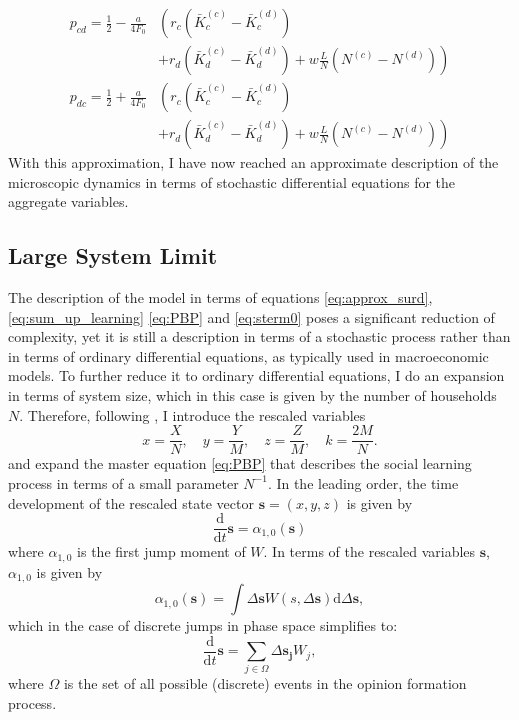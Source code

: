 \begin{align}
	p_{cd} = \frac{1}{2} - \frac{a}{4 F_0} &\left(r_c\left( \bar{K}_c^{(c)} - \bar{K}_c^{(d)} \right) \right. \nonumber \\ 
	& \left. + r_d\left( \bar{K}_d^{(c)} - \bar{K}_d^{(d)} \right) + w\frac{L}{N}\left( N^{(c)} - N^{(d)} \right) \right) \label{eq:approx_p_cd_final}\\
	p_{dc} = \frac{1}{2} + \frac{a}{4 F_0} &\left(r_c\left( \bar{K}_c^{(c)} - \bar{K}_c^{(d)} \right) \right. \nonumber \\ 
	& \left. + r_d\left( \bar{K}_d^{(c)} - \bar{K}_d^{(d)} \right) + w\frac{L}{N}\left( N^{(c)} - N^{(d)} \right) \right)  \label{eq:approx_p_dc_final}
\end{align}
With this approximation, I have now reached an approximate description of the microscopic dynamics in terms of stochastic differential equations for the aggregate variables.
\subsection{Large System Limit}
\label{sec:large_system_limit}
The description of the model in terms of equations \eqref{eq:approx_surd}, \eqref{eq:sum_up_learning} \eqref{eq:PBP} and \eqref{eq:sterm0} poses a significant reduction of complexity, yet it is still a description in terms of a stochastic process rather than in terms of ordinary differential equations, as typically used in macroeconomic models. To further reduce it to ordinary differential equations, I do an expansion in terms of system size, which in this case is given by the number of households $N$.
Therefore, following \citet[p. 244]{VanKampen1992}, I introduce the rescaled variables
\begin{equation}
	x = \frac{X}{N}, \quad y = \frac{Y}{M}, \quad z = \frac{Z}{M}, \quad k = \frac{2M}{N}.
	\label{eq:rescalled_pbp_variables}
\end{equation}
and expand the master equation \eqref{eq:PBP} that describes the social learning process in terms of a small parameter $N^{-1}$. In the leading order, the time development of the rescaled state vector $\mathbf{s} = (x, y, z)$ is given by 
\begin{equation}
	\frac{\mathrm{d}}{\mathrm{d}t}\mathbf{s} = \alpha_{1,0}(\mathbf{s})
	\label{macroscopic_equation}
\end{equation}
where $\alpha_{1,0}$ is the first jump moment of $W$. In terms of the rescaled variables $\mathbf{s}$, $\alpha_{1,0}$ is given by
\begin{equation}
	\alpha_{1,0}(\mathbf{s}) = \int \Delta \mathbf{s} W(s, \Delta \mathbf{s}) \mathrm{ d} \Delta \mathbf{s},
	\label{eq:jump_moment}
\end{equation}
which in the case of discrete jumps in phase space simplifies to:
\begin{equation}
	\frac{\mathrm{d}}{\mathrm{d}t}\mathbf{s} = \sum_{j \in \Omega}  \Delta \mathbf{s_j} W_j,
	\label{eq:lsl_transitions}
\end{equation}
where $\Omega$ is the set of all possible (discrete) events in the opinion formation process.

